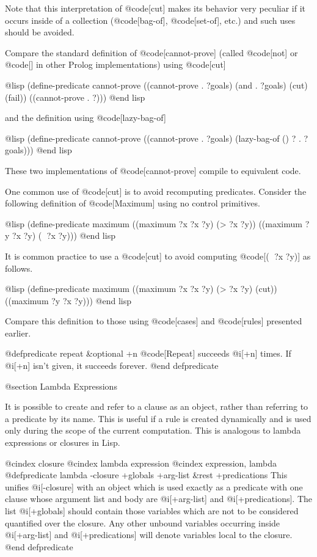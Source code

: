 {Note that this interpretation of @code[cut] makes its behavior very peculiar if
it occurs inside of a collection (@code[bag-of], @code[set-of], etc.) and such
uses should be avoided.

Compare the standard definition of @code[cannot-prove]
(called @code[not] or @code[\+] in other Prolog implementations) using
@code[cut]

@lisp
(define-predicate cannot-prove
  ((cannot-prove . ?goals) 
   (and . ?goals) 
   (cut) 
   (fail))
  ((cannot-prove . ?)))
@end lisp

and the definition using @code[lazy-bag-of]

@lisp
(define-predicate cannot-prove
  ((cannot-prove . ?goals) 
   (lazy-bag-of () ? . ?goals)))
@end lisp

These two implementations of @code[cannot-prove] compile to equivalent code.

One common use of @code[cut] is to avoid recomputing predicates.
Consider the following definition of @code[Maximum] using no control
primitives.

@lisp
(define-predicate maximum
  ((maximum ?x ?x ?y) (> ?x ?y))
  ((maximum ?y ?x ?y) ( ?x ?y)))
@end lisp

It is common practice to use a @code[cut]
to avoid computing @code[( ?x ?y)] as follows.

@lisp
(define-predicate maximum
  ((maximum ?x ?x ?y) (> ?x ?y) (cut))
  ((maximum ?y ?x ?y)))
@end lisp

Compare this definition to those using @code[cases] and @code[rules] presented
earlier.

@defpredicate repeat &optional +n
@code[Repeat] succeeds @i[+n] times. If @i[+n] isn't given, it succeeds
forever.
@end defpredicate

@section Lambda Expressions

It is possible to create and refer to a clause as an object, rather
than referring to a predicate by its name.  This is useful if a rule
is created dynamically and is used only during the scope of the current
computation.  This is analogous to lambda expressions or closures in
Lisp.

@cindex closure
@cindex lambda expression
@cindex expression, lambda
@defpredicate lambda -closure +globals +arg-list &rest +predications
This unifies @i[-closure] with an object which is used exactly as
a predicate with one clause whose argument list and body are
@i[+arg-list] and @i[+predications].  The list @i[+globals] should
contain those variables which are not to be considered quantified
over the closure.  Any other unbound variables occurring inside
@i[+arg-list] and @i[+predications] will denote variables local to
the closure.
@end defpredicate

}
